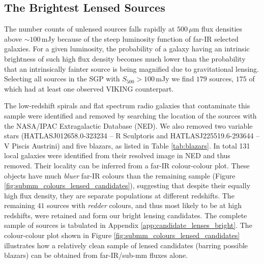 \subsection{The Brightest Lensed Sources}
\label{sec:brightest_lenses}

The number counts of unlensed sources falls rapidly at $500\,\mu$m flux densities above $\sim 100\,$mJy because of the steep luminosity function of far-IR selected galaxies. For a given luminosity, the probability of a galaxy having an intrinsic brightness of such high flux density becomes much lower than the probability that an intrinsically fainter source is being magnified due to gravitational lensing. Selecting all sources in the SGP with $S_{500} > 100\,$mJy we find $179$ sources, $175$ of which had at least one observed VIKING counterpart. 

The low-redshift spirals and flat spectrum radio galaxies that contaminate this sample were identified and removed by searching the location of the sources with the NASA/IPAC Extragalactic Database (NED). We also removed two variable stars (HATLASJ012658.0-323234 -- R Sculptoris and HATLASJ225519.6-293644 -- V Piscis Austrini) and five blazars, as listed in Table \ref{tab:blazars}. In total 131 local galaxies were identified from their resolved image in NED and thus removed. Their locality can be inferred from a far-IR colour-colour plot. These objects have much \textit{bluer} far-IR colours than the remaining sample (Figure \ref{fig:submm_colours_lensed_candidates}), suggesting that despite their equally high flux density, they are separate populations at different redshifts. The remaining $41$ sources with \textit{redder} colours, and thus most likely to be at high redshifts, were retained and form our bright lensing candidates. The complete sample of sources is tabulated in Appendix \ref{app:candidate_lenses_bright}. The colour-colour plot shown in Figure \ref{fig:submm_colours_lensed_candidates} illustrates how a relatively clean sample of lensed candidates (barring possible blazars) can be obtained from far-IR/sub-mm fluxes alone.

